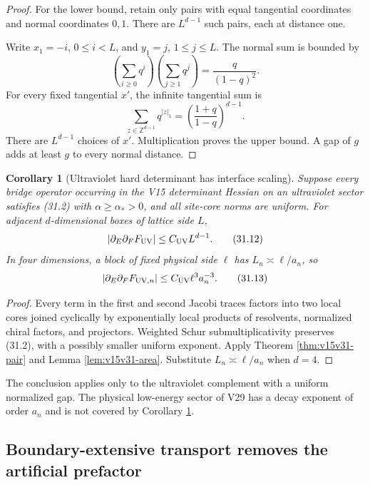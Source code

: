 \documentclass[11pt]{article}
\newtheorem{corollary}[theorem]{Corollary}
\theoremstyle{remark}
\begin{document}
\begin{proof}
For the lower bound, retain only pairs with equal tangential
coordinates and normal coordinates \(0,1\).  There are
\(L^{d-1}\) such pairs, each at distance one.

Write \(x_1=-i\), \(0\le i<L\), and \(y_1=j\),
\(1\le j\le L\).  The normal sum is bounded by
\[
 \left(\sum_{i\ge0}q^i\right)
 \left(\sum_{j\ge1}q^j\right)
 =
 \frac{q}{(1-q)^2}.                                       \tag{31.10}
\]
For every fixed tangential \(x'\), the infinite tangential sum is
\[
 \sum_{z\in\mathbb Z^{d-1}}q^{|z|_1}
 =
 \left(\frac{1+q}{1-q}\right)^{d-1}.                       \tag{31.11}
\]
There are \(L^{d-1}\) choices of \(x'\).  Multiplication proves the
upper bound.  A gap of \(g\) adds at least \(g\) to every normal
distance.
\end{proof}

\begin{corollary}[Ultraviolet hard determinant has interface
scaling]
\label{cor:v15v31-uv}
Suppose every bridge operator occurring in the V15 determinant
Hessian on an ultraviolet sector satisfies (31.2) with
\(\alpha\ge\alpha_*>0\), and all site-core norms are uniform.  For
adjacent \(d\)-dimensional boxes of lattice side \(L\),
\[
 |\partial_E\partial_FF_{\rm UV}|
 \le C_{\rm UV}L^{d-1}.                                    \tag{31.12}
\]
In four dimensions, a block of fixed physical side \(\ell\) has
\(L_n\asymp\ell/a_n\), so
\[
 |\partial_E\partial_FF_{{\rm UV},n}|
 \le C_{\rm UV}\ell^3a_n^{-3}.                             \tag{31.13}
\]
\end{corollary}

\begin{proof}
Every term in the first and second Jacobi traces factors into two
local cores joined cyclically by exponentially local products of
resolvents, normalized chiral factors, and projectors.  Weighted
Schur submultiplicativity preserves (31.2), with a possibly smaller
uniform exponent.  Apply Theorem \ref{thm:v15v31-pair} and Lemma
\ref{lem:v15v31-area}.  Substitute \(L_n\asymp\ell/a_n\) when
\(d=4\).
\end{proof}

The conclusion applies only to the ultraviolet complement with a
uniform normalized gap.  The physical low-energy sector of V29 has
a decay exponent of order \(a_n\) and is not covered by
Corollary \ref{cor:v15v31-uv}.

\subsection{Boundary-extensive transport removes the artificial
prefactor}
\end{document}
